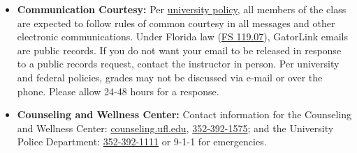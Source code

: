 \documentclass[11pt]{article}
\begin{document}
\begin{itemize}
	\item \textbf{Communication Courtesy:} Per {\href{http://teach.ufl.edu/wp-content/uploads/2012/08/NetiquetteGuideforOnlineCourses.pdf}{university policy}}, all members of the class are expected to follow rules of common courtesy in all messages and other electronic communications. Under Florida law ({\href{http://www.leg.state.fl.us/Statutes/index.cfm?App_mode=Display_Statute&URL=0100-0199/0119/Sections/0119.07.html}{FS 119.07}}), GatorLink emails are public records. If you do not want your email to be released in response to a public records request, contact the instructor in person. Per university and federal policies, grades may not be discussed via e-mail or over the phone. Please allow 24-48 hours for a response.
	\item \textbf{Counseling and Wellness Center:} Contact information for the Counseling and Wellness Center: {\href{https://counseling.ufl.edu}{counseling.ufl.edu}}, {\href{tel:3523921575}{352-392-1575}}; and the University Police Department: {\href{tel:3523921111}{352-392-1111}} or 9-1-1 for emergencies.
	\end{itemize}
\end{document}
